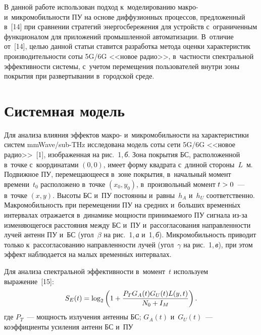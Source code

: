 \begin{multicols}{2}
{} 
  
  В данной работе использован подход к~моделированию макро- 
и~микромобильности ПУ на основе диффузионных процессов, предложенный 
в~[14] при сравнении стратегий энергосбережения для устройств с~ограниченным 
функционалом для приложений промышленной автоматизации. В~отличие 
от~[14], целью данной статьи ставится разработка метода оценки характеристик 
производительности соты 5G/6G <<новое радио>>, в~частности спектральной 
эффективности системы, с~учетом перемещения пользователей внутри зоны 
покрытия при развертывании в~городской среде.

\section{Системная модель}

  Для анализа влияния эффектов макро- и~микромобильности на характеристики 
систем mmWave/sub-THz исследована модель соты сети 5G/6G <<новое 
радио>>~[1], изображенная на рис.~1,\,\textit{б}. Зона покрытия БС, 
расположенной в~точке с~координатами $(0, 0)$, имеет форму квадрата с~длиной 
стороны~$L$~м. Подвижное ПУ, перемещающееся в~зоне покрытия, в~начальный 
момент времени~$t_0$ расположено в~точке $(x_0,y_0)$, в~произвольный момент 
$t\hm>0$~--- в~точке $(x,y)$. Высоты БС и~ПУ постоянны и~равны~$h_A$
  и~$h_U$ соответственно. Макромобильность при перемещении ПУ на средних и~больших временн$\acute{\mbox{ы}}$х интервалах отражается в~динамике мощности 
принимаемого ПУ сигнала из-за изменяющегося расстояния между БС и~ПУ 
и~рассогласования направленности лучей антенн ПУ и~БС (угол~$\beta$ на 
рис.~1,\,\textit{а} и~1,\,\textit{б}). Микромобильность приводит только 
к~рассогласованию на\-прав\-лен\-ности лучей (угол~$\gamma$ на рис.~1,\,\textit{в}), 
при этом эффект наблюдается на малых временн$\acute{\mbox{ы}}$х интервалах.
  


  Для анализа спектральной эффективности в~момент~$t$ используем 
выражение~[15]:
  \begin{equation}
  S_E(t)= \log_2 \left( 1+\displaystyle\frac{\displaystyle P_T G_A(t)G_U(t)L(y,t)\mathstrut}{\displaystyle N_0+I_M\mathstrut}\right).
  \label{e1-ost}
  \end{equation}
где $P_T$~--- мощность излучения антенны БС; $G_A(t)$ и~$G_U(t)$~--- 
коэффициенты усиления антенн БС и~ПУ\linebreak\vspace*{-12pt}

{ \begin{center}  %
 \vspace*{6pt}
    \mbox{%
\epsfxsize=77.964mm 
}


\end{center}}
\end{multicols}
